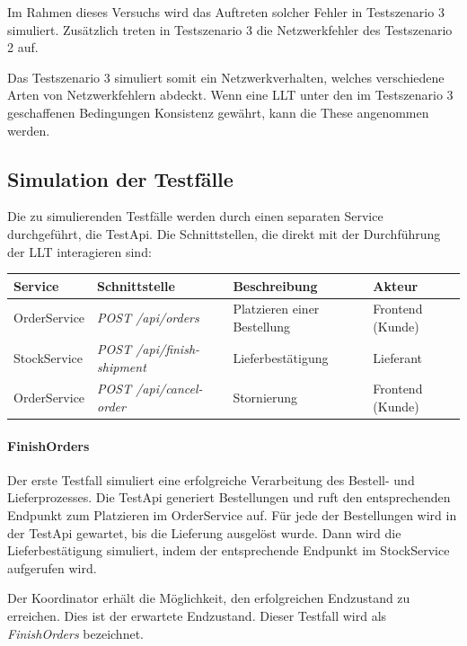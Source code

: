 Im Rahmen dieses Versuchs wird das Auftreten solcher Fehler in Testszenario 3 simuliert. Zusätzlich treten in Testszenario 3 die Netzwerkfehler des Testszenario 2 auf. 

Das Testszenario 3 simuliert somit ein Netzwerkverhalten, welches verschiedene Arten von Netzwerkfehlern abdeckt. Wenn eine LLT unter den im Testszenario 3 geschaffenen Bedingungen Konsistenz gewährt, kann die These angenommen werden.


\subsection{Simulation der Testfälle}
Die zu simulierenden Testfälle werden durch einen separaten Service durchgeführt, die TestApi. Die Schnittstellen, die direkt mit der Durchführung der LLT interagieren sind:

\begin{center}
	\begin{longtable}[h]{|p{2.3cm}|p{4.9cm}|p{3.2cm}|p{3.4cm}|}
		\hline
		Service & Schnittstelle & Beschreibung & Akteur \\ \hline
		OrderService & \textit{POST /api/orders} & Platzieren einer Bestellung & Frontend (Kunde) \\ \hline
		StockService & \textit{POST /api/finish-shipment} & Lieferbestätigung & Lieferant \\ \hline
		OrderService & \textit{POST /api/cancel-order} & Stornierung & Frontend (Kunde) \\ \hline
	\end{longtable}
\end{center}
\FloatBarrier

\paragraph*{FinishOrders}
Der erste Testfall simuliert eine erfolgreiche Verarbeitung des Bestell- und Lieferprozesses. Die TestApi generiert Bestellungen und ruft den entsprechenden Endpunkt zum Platzieren im OrderService auf. Für jede der Bestellungen wird in der TestApi gewartet, bis die Lieferung ausgelöst wurde. Dann wird die Lieferbestätigung simuliert, indem der entsprechende Endpunkt im StockService aufgerufen wird. 

Der Koordinator erhält die Möglichkeit, den erfolgreichen Endzustand zu erreichen. Dies ist der erwartete Endzustand. Dieser Testfall wird als \textit{FinishOrders} bezeichnet. 

